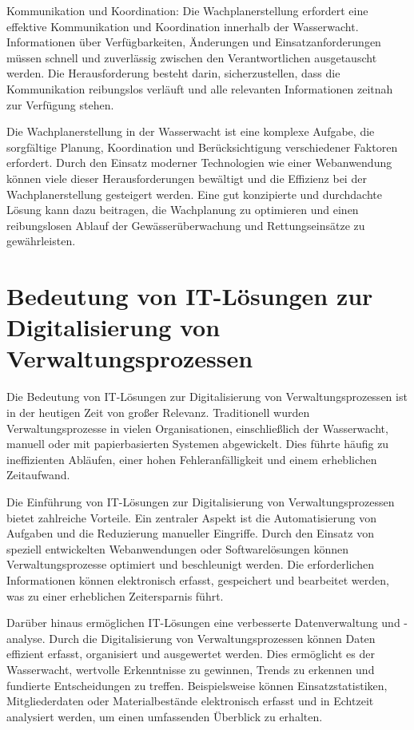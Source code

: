 \documentclass[fontsize=12pt,openright,oneside,paper=a4,BCOR=1cm]{scrbook}
\begin{document}
    Kommunikation und Koordination: Die Wachplanerstellung erfordert eine effektive Kommunikation und Koordination innerhalb der Wasserwacht. Informationen über Verfügbarkeiten, Änderungen und Einsatzanforderungen müssen schnell und zuverlässig zwischen den Verantwortlichen ausgetauscht werden. Die Herausforderung besteht darin, sicherzustellen, dass die Kommunikation reibungslos verläuft und alle relevanten Informationen zeitnah zur Verfügung stehen.

Die Wachplanerstellung in der Wasserwacht ist eine komplexe Aufgabe, die sorgfältige Planung, Koordination und Berücksichtigung verschiedener Faktoren erfordert. Durch den Einsatz moderner Technologien wie einer Webanwendung können viele dieser Herausforderungen bewältigt und die Effizienz bei der Wachplanerstellung gesteigert werden. Eine gut konzipierte und durchdachte Lösung kann dazu beitragen, die Wachplanung zu optimieren und einen reibungslosen Ablauf der Gewässerüberwachung und Rettungseinsätze zu gewährleisten.

\section{Bedeutung von IT-Lösungen zur Digitalisierung von Verwaltungsprozessen} 

Die Bedeutung von IT-Lösungen zur Digitalisierung von Verwaltungsprozessen ist in der heutigen Zeit von großer Relevanz. Traditionell wurden Verwaltungsprozesse in vielen Organisationen, einschließlich der Wasserwacht, manuell oder mit papierbasierten Systemen abgewickelt. Dies führte häufig zu ineffizienten Abläufen, einer hohen Fehleranfälligkeit und einem erheblichen Zeitaufwand.

Die Einführung von IT-Lösungen zur Digitalisierung von Verwaltungsprozessen bietet zahlreiche Vorteile. Ein zentraler Aspekt ist die Automatisierung von Aufgaben und die Reduzierung manueller Eingriffe. Durch den Einsatz von speziell entwickelten Webanwendungen oder Softwarelösungen können Verwaltungsprozesse optimiert und beschleunigt werden. Die erforderlichen Informationen können elektronisch erfasst, gespeichert und bearbeitet werden, was zu einer erheblichen Zeitersparnis führt.

Darüber hinaus ermöglichen IT-Lösungen eine verbesserte Datenverwaltung und -analyse. Durch die Digitalisierung von Verwaltungsprozessen können Daten effizient erfasst, organisiert und ausgewertet werden. Dies ermöglicht es der Wasserwacht, wertvolle Erkenntnisse zu gewinnen, Trends zu erkennen und fundierte Entscheidungen zu treffen. Beispielsweise können Einsatzstatistiken, Mitgliederdaten oder Materialbestände elektronisch erfasst und in Echtzeit analysiert werden, um einen umfassenden Überblick zu erhalten.
\end{document}
